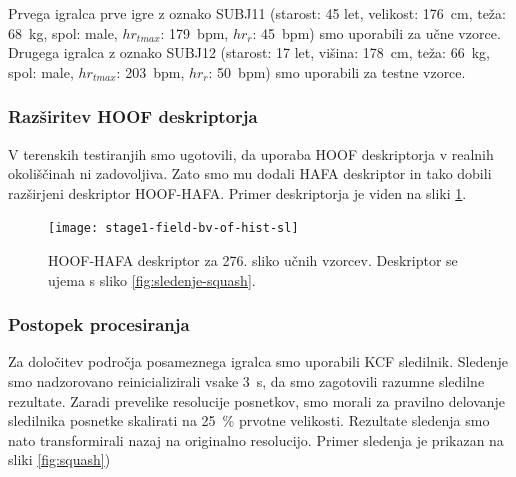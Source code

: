 Prvega igralca prve igre z oznako SUBJ11  (starost: 45 let, velikost: \SI{176}{\cm}, teža: \SI{68}{\kg}, spol: male, $hr_{tmax}$: \SI{179}{bpm}, $hr_{r}$: \SI{45}{bpm}) smo uporabili za učne vzorce. Drugega igralca z oznako SUBJ12 (starost: 17 let, višina: \SI{178}{\cm}, teža: \SI{66}{\kg}, spol: male, $hr_{tmax}$: \SI{203}{bpm}, $hr_{r}$: \SI{50}{bpm}) smo uporabili za testne vzorce. 

\subsubsection{Razširitev HOOF deskriptorja}
V terenskih testiranjih smo ugotovili, da uporaba HOOF deskriptorja v realnih okoliščinah ni zadovoljiva. Zato smo mu dodali HAFA deskriptor in tako dobili razširjeni deskriptor HOOF-HAFA. Primer deskriptorja je viden na sliki \ref{fig:hoof-hafa}.

\begin{figure}[!htb]
	\centering
	\texttt{[image: stage1-field-bv-of-hist-sl]}
	\caption[HOOF-HAFA deskriptor za 276. sliko učnih vzorcev]{HOOF-HAFA deskriptor za 276. sliko učnih vzorcev. Deskriptor se ujema s sliko \ref{fig:sledenje-squash}.}
	\label{fig:hoof-hafa}
\end{figure}

\subsubsection{Postopek procesiranja}
Za določitev področja posameznega igralca smo uporabili KCF sledilnik. 
Sledenje smo nadzorovano reinicializirali vsake \SI{3}{\s}, da smo zagotovili razumne sledilne rezultate. Zaradi prevelike resolucije posnetkov, smo morali za pravilno delovanje sledilnika posnetke skalirati na \SI{25}{\%} prvotne velikosti. Rezultate sledenja smo nato transformirali nazaj na originalno resolucijo. Primer sledenja je prikazan na sliki \ref{fig:squash})


